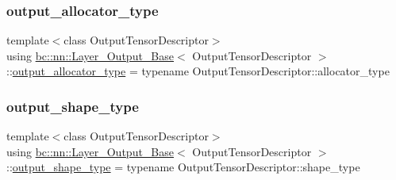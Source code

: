 \subsubsection{\texorpdfstring{output\+\_\+allocator\+\_\+type}{output\_allocator\_type}\hspace{0.1cm}{\footnotesize\ttfamily [2/2]}}
{\footnotesize\ttfamily template$<$class Output\+Tensor\+Descriptor$>$ \\
using \hyperlink{structbc_1_1nn_1_1Layer__Output__Base}{bc\+::nn\+::\+Layer\+\_\+\+Output\+\_\+\+Base}$<$ Output\+Tensor\+Descriptor $>$\+::\hyperlink{structbc_1_1nn_1_1Layer__Output__Base_a7cde98d6bf97cd5bc4aef4039ee26536}{output\+\_\+allocator\+\_\+type} =  typename Output\+Tensor\+Descriptor\+::allocator\+\_\+type}

\mbox{\label{structbc_1_1nn_1_1Layer__Output__Base_a62aab794fb2d836a215498128a7ad9b7}} 
\subsubsection{\texorpdfstring{output\+\_\+shape\+\_\+type}{output\_shape\_type}\hspace{0.1cm}{\footnotesize\ttfamily [1/2]}}
{\footnotesize\ttfamily template$<$class Output\+Tensor\+Descriptor$>$ \\
using \hyperlink{structbc_1_1nn_1_1Layer__Output__Base}{bc\+::nn\+::\+Layer\+\_\+\+Output\+\_\+\+Base}$<$ Output\+Tensor\+Descriptor $>$\+::\hyperlink{structbc_1_1nn_1_1Layer__Output__Base_aa627047014ee5dff2b9cc1804c791815}{output\+\_\+shape\+\_\+type} =  typename Output\+Tensor\+Descriptor\+::shape\+\_\+type}

\mbox{\label{structbc_1_1nn_1_1Layer__Output__Base_aa627047014ee5dff2b9cc1804c791815}} 
